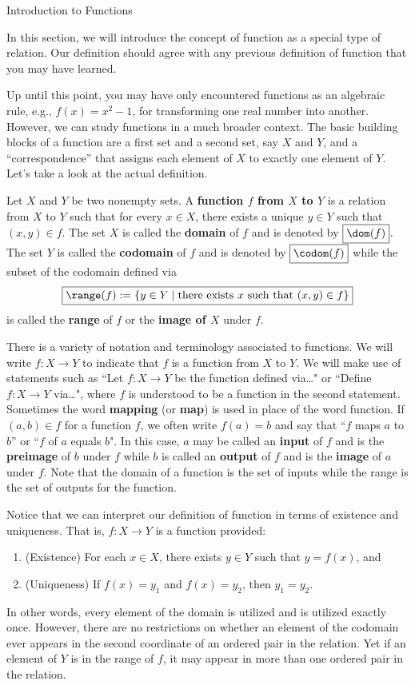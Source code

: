\begin{section}{Introduction to Functions}

In this section, we will introduce the concept of function as a special type of relation.  Our definition should agree with any previous definition of function that you may have learned.

Up until this point, you may have only encountered functions as an algebraic rule, e.g., $f(x)=x^{2}-1$, for transforming one real number into another.  However, we can study functions in a much broader context.  The basic building blocks of a function are a first set and a second set, say $X$ and $Y$, and a ``correspondence'' that assigns each element of $X$ to exactly one element of $Y$.  Let's take a look at the actual definition.

\begin{definition}\label{def:function}
Let $X$ and $Y$ be two nonempty sets.  A \textbf{function $f$ from $X$ to $Y$} is a relation from $X$ to $Y$ such that for every $x\in X$, there exists a unique $y\in Y$ such that $(x,y)\in f$. The set $X$ is called the \textbf{domain} of $f$ and is denoted by $\boxed{\dom(f)}$.  The set $Y$ is called the \textbf{codomain} of $f$ and is denoted by $\boxed{\codom(f)}$ while the subset of the codomain defined via
\[
\boxed{\range(f):=\{y\in Y\mid \mbox{there exists }x\mbox{ such that } (x,y)\in f\}}
\]
is called the \textbf{range} of $f$ or the \textbf{image of $X$} under $f$.
\end{definition}

There is a variety of notation and terminology associated to functions. We will write $\boxed{f:X\to Y}$ to indicate that $f$ is a function from $X$ to $Y$. We will make use of statements such as ``Let $f:X\to Y$ be the function defined via\ldots" or ``Define $f:X\to Y$ via\ldots", where $f$ is understood to be a function in the second statement. Sometimes the word \textbf{mapping} (or \textbf{map}) is used in place of the word function.  If $(a,b)\in f$ for a function $f$, we often write $\boxed{f(a)=b}$ and say that ``$f$ maps $a$ to $b$'' or ``$f$ of $a$ equals $b$". In this case, $a$ may be called an \textbf{input} of $f$ and is the \textbf{preimage} of $b$ under $f$ while $b$ is called an \textbf{output} of $f$ and is the \textbf{image} of $a$ under $f$. Note that the domain of a function is the set of inputs while the range is the set of outputs for the function.
 
Notice that we can interpret our definition of function in terms of existence and uniqueness.  That is, $f:X\to Y$ is a function provided:
\begin{enumerate}
\item (Existence) For each $x\in X$, there exists $y\in Y$ such that $y=f(x)$, and
\item (Uniqueness) If $f(x)=y_1$ and $f(x)=y_2$, then $y_{1}=y_{2}$.
\end{enumerate}
In other words, every element of the domain is utilized and is utilized exactly once. However, there are no restrictions on whether an element of the codomain ever appears in the second coordinate of an ordered pair in the relation.  Yet if an element of $Y$ is in the range of $f$, it may appear in more than one ordered pair in the relation.


\end{section}
